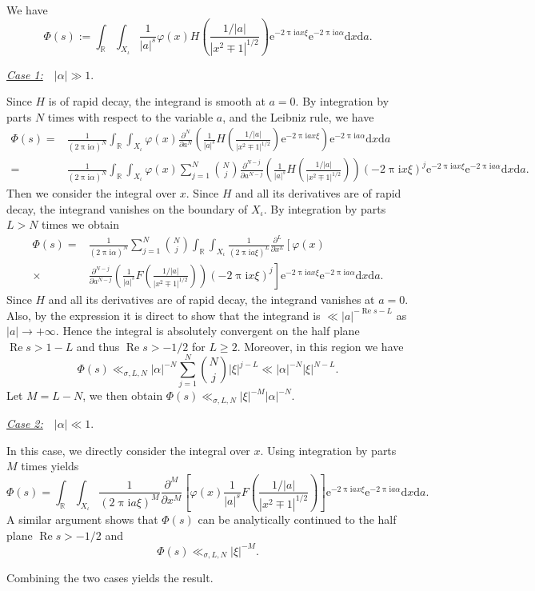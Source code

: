 \documentclass[10pt,oneside,reqno]{amsart}
\makeatletter
\newcommand\rmd{\mathrm{d}}
\newcommand\rme{\mathrm{e}}
\newcommand\rmi{\mathrm{i}}
\newcommand\RR{\mathbb{R}}
\newcommand\dpii{2\uppi\rmi}
\newcommand\diff{\partial}
\renewcommand\Re{\mathop{\mathrm{Re}}}
\renewcommand\geq{\geqslant}
\newcommand\legendresymbol[2]{\genfrac{(}{)}{}{}{#1}{#2}}
\theoremstyle{THEOREM}
\theoremstyle{DEFINITION}
\theoremstyle{EXERCISE}
\numberwithin{equation}{section}
\renewenvironment{proof}[1][\proofname]{\par
  \vspace{-6pt}
  \pushQED{\qed}
  \normalfont \topsep6\p@\@plus6\p@\relax
  \trivlist
  \item[\hskip\labelsep\rmfamily\bfseries
    #1\@addpunct{:}]\ignorespaces
}{
  \popQED\endtrivlist\@endpefalse
  \vspace{-6pt}
}
\makeatother
\begin{document}
\begin{proof}
We have
\[
\Phi(s):=\int_{\RR}\int_{X_\iota}\frac{1}{|a|^{s}}\varphi(x)H\legendresymbol {1/|a|}{|x^2\mp 1|^{1/2}}\rme^{-\dpii ax\xi}\rme^{-\dpii a\alpha}\rmd x\rmd a.
\]

\underline{\emph{Case 1:}}\ \ $|\alpha|\gg 1$.

Since $H$ is of rapid decay, the integrand is smooth at $a=0$. By integration by parts $N$ times with respect to the variable $a$, and the Leibniz rule, we have
\begin{align*}
\Phi(s)=&\frac{1}{(\dpii\alpha)^N}\int_{\RR}\int_{X_\iota}\varphi(x)\frac{\diff^N}{\diff a^N}\left(\frac{1}{|a|^s}H\legendresymbol{1/|a|}{|x^2\mp 1|^{1/2}}\rme^{-\dpii ax\xi}\right)\rme^{-\dpii a\alpha}\rmd x\rmd a\\
=&\frac{1}{(\dpii\alpha)^N}\int_{\RR}\int_{X_\iota}\varphi(x)\sum_{j=1}^{N}\binom{N}{j} \frac{\diff^{N-j}}{\diff a^{N-j}}\left(\frac{1}{|a|^s}H\legendresymbol{1/|a|}{|x^2\mp 1|^{1/2}}\right)(-\dpii x\xi)^j\rme^{-\dpii ax\xi}\rme^{-\dpii a\alpha}\rmd x\rmd a.
\end{align*}
Then we consider the integral over $x$. Since $H$ and all its derivatives are of rapid decay, the integrand vanishes on the boundary of $X_\iota$.
By integration by parts $L>N$ times we obtain
\begin{align*}
\Phi(s)=&\frac{1}{(\dpii\alpha)^N}\sum_{j=1}^{N}\binom{N}{j}\int_{\RR}\int_{X_\iota} \frac{1}{(\dpii a\xi)^L}\frac{\diff^{L}}{\diff x^{L}}\left[\varphi(x)\right.\\
\times&\left. \frac{\diff^{N-j}}{\diff a^{N-j}}\left(\frac{1}{|a|^s}F\legendresymbol{1/|a|}{|x^2\mp 1|^{1/2}}\right)(-\dpii x\xi)^j\right]\rme^{-\dpii ax\xi}\rme^{-\dpii a\alpha}\rmd x\rmd a.
\end{align*}
Since $H$ and all its derivatives are of rapid decay, the integrand vanishes at $a=0$. Also, by the expression it is direct to show that the integrand is $\ll |a|^{-\Re s-L}$ as $|a|\to +\infty$. Hence the integral is absolutely convergent on the half plane $\Re s>1-L$ and thus $\Re s>-1/2$ for $L\geq 2$. Moreover, in this region we have
\[
\Phi(s)\ll_{\sigma,L,N} |\alpha|^{-N}\sum_{j=1}^{N}\binom{N}{j}|\xi|^{j-L}\ll |\alpha|^{-N}|\xi|^{N-L}.
\]
Let $M=L-N$, we then obtain $\Phi(s)\ll_{\sigma,L,N}|\xi|^{-M}|\alpha|^{-N}$.

\underline{\emph{Case 2:}}\ \ $|\alpha|\ll 1$.

In this case, we directly consider the integral over $x$. Using integration by parts $M$ times yields
\[
\Phi(s)=\int_{\RR}\int_{X_\iota} \frac{1}{(\dpii a\xi)^M}\frac{\diff^{M}}{\diff x^{M}}\left[\varphi(x) \frac{1}{|a|^s}F\legendresymbol{1/|a|}{|x^2\mp 1|^{1/2}}\right]\rme^{-\dpii ax\xi}\rme^{-\dpii a\alpha}\rmd x\rmd a.
\]
A similar argument shows that $ \Phi(s)$ can be analytically continued to the half plane $\Re s>-1/2$ and  
\[
\Phi(s)\ll_{\sigma,L,N}|\xi|^{-M}.
\]

Combining the two cases yields the result.
\end{proof}
\end{document}

